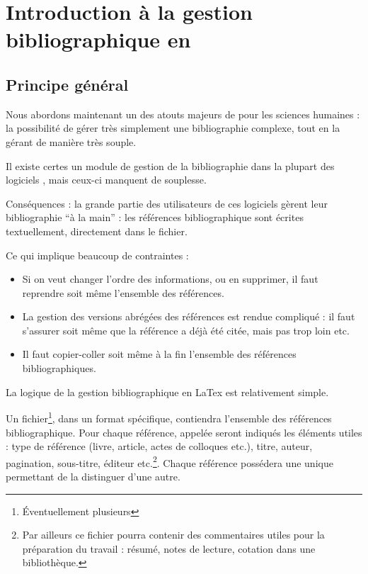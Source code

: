 \chapter[Introduction]{Introduction à la gestion bibliographique en \logiciel{\LaTex}}
\section{Principe général}

Nous abordons maintenant un des atouts majeurs de \logiciel{\LaTeX} pour les sciences humaines : la possibilité de gérer très simplement une bibliographie complexe, tout en la gérant de manière très souple.

Il existe certes un module de gestion de la bibliographie dans la plupart des logiciels , mais ceux-ci manquent de souplesse.

Conséquences : la grande partie des utilisateurs de ces logiciels gèrent leur bibliographie \enquote{à la main} : les références bibliographique sont écrites textuellement, directement dans le fichier. 

Ce qui implique beaucoup de contraintes  :
\begin{itemize}
\item Si on veut changer l'ordre des informations, ou en supprimer, il faut reprendre soit même l'ensemble des références.
\item La gestion des versions abrégées des références est rendue compliqué :  il faut s'assurer soit même que la référence a déjà été citée, mais pas trop loin etc. 
\item Il faut copier-coller soit même à la fin l'ensemble des références bibliographiques. 
\end{itemize}

La logique de la gestion bibliographique en LaTex est relativement simple.

Un fichier\footnote{Éventuellement plusieurs}, dans un format spécifique, contiendra l'ensemble des références bibliographique. Pour chaque référence, appelée  seront indiqués les éléments utiles :  type de référence (livre, article, actes de colloques etc.), titre, auteur, pagination, sous-titre, éditeur etc.\footnote{Par ailleurs ce fichier pourra contenir des commentaires utiles pour la préparation du travail : résumé, notes de lecture, cotation dans une bibliothèque.
}. Chaque référence possédera une  unique permettant de la distinguer d'une autre.

